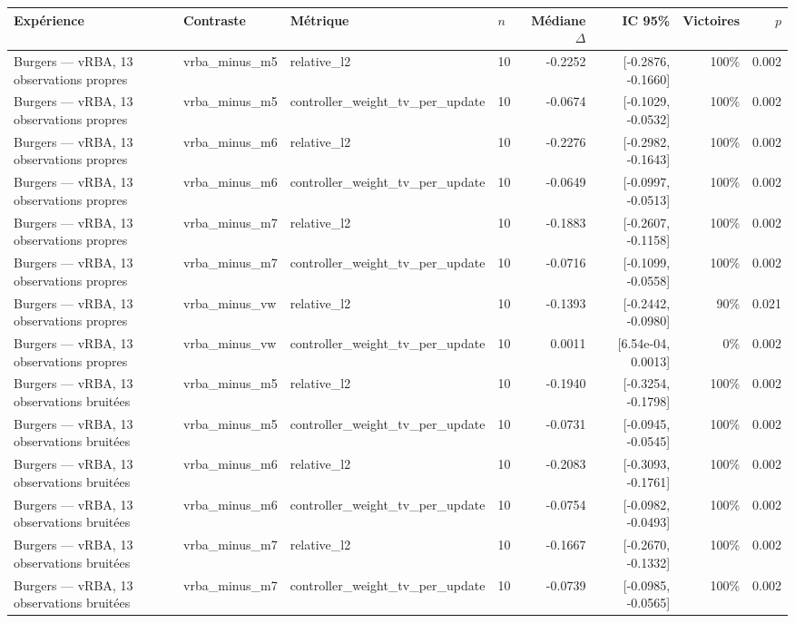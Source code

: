 \begin{tabular}{llllrrrr}
\toprule
Expérience & Contraste & Métrique & $n$ & Médiane $\Delta$ & IC 95\% & Victoires & $p$ \\
\midrule
Burgers — vRBA, 13 observations propres & vrba\_minus\_m5 & relative\_l2 & 10 & -0.2252 & [-0.2876, -0.1660] & 100\% & 0.002 \\
Burgers — vRBA, 13 observations propres & vrba\_minus\_m5 & controller\_weight\_tv\_per\_update & 10 & -0.0674 & [-0.1029, -0.0532] & 100\% & 0.002 \\
Burgers — vRBA, 13 observations propres & vrba\_minus\_m6 & relative\_l2 & 10 & -0.2276 & [-0.2982, -0.1643] & 100\% & 0.002 \\
Burgers — vRBA, 13 observations propres & vrba\_minus\_m6 & controller\_weight\_tv\_per\_update & 10 & -0.0649 & [-0.0997, -0.0513] & 100\% & 0.002 \\
Burgers — vRBA, 13 observations propres & vrba\_minus\_m7 & relative\_l2 & 10 & -0.1883 & [-0.2607, -0.1158] & 100\% & 0.002 \\
Burgers — vRBA, 13 observations propres & vrba\_minus\_m7 & controller\_weight\_tv\_per\_update & 10 & -0.0716 & [-0.1099, -0.0558] & 100\% & 0.002 \\
Burgers — vRBA, 13 observations propres & vrba\_minus\_vw & relative\_l2 & 10 & -0.1393 & [-0.2442, -0.0980] & 90\% & 0.021 \\
Burgers — vRBA, 13 observations propres & vrba\_minus\_vw & controller\_weight\_tv\_per\_update & 10 & 0.0011 & [6.54e-04, 0.0013] & 0\% & 0.002 \\
Burgers — vRBA, 13 observations bruitées & vrba\_minus\_m5 & relative\_l2 & 10 & -0.1940 & [-0.3254, -0.1798] & 100\% & 0.002 \\
Burgers — vRBA, 13 observations bruitées & vrba\_minus\_m5 & controller\_weight\_tv\_per\_update & 10 & -0.0731 & [-0.0945, -0.0545] & 100\% & 0.002 \\
Burgers — vRBA, 13 observations bruitées & vrba\_minus\_m6 & relative\_l2 & 10 & -0.2083 & [-0.3093, -0.1761] & 100\% & 0.002 \\
Burgers — vRBA, 13 observations bruitées & vrba\_minus\_m6 & controller\_weight\_tv\_per\_update & 10 & -0.0754 & [-0.0982, -0.0493] & 100\% & 0.002 \\
Burgers — vRBA, 13 observations bruitées & vrba\_minus\_m7 & relative\_l2 & 10 & -0.1667 & [-0.2670, -0.1332] & 100\% & 0.002 \\
Burgers — vRBA, 13 observations bruitées & vrba\_minus\_m7 & controller\_weight\_tv\_per\_update & 10 & -0.0739 & [-0.0985, -0.0565] & 100\% & 0.002 \\

\end{tabular}

